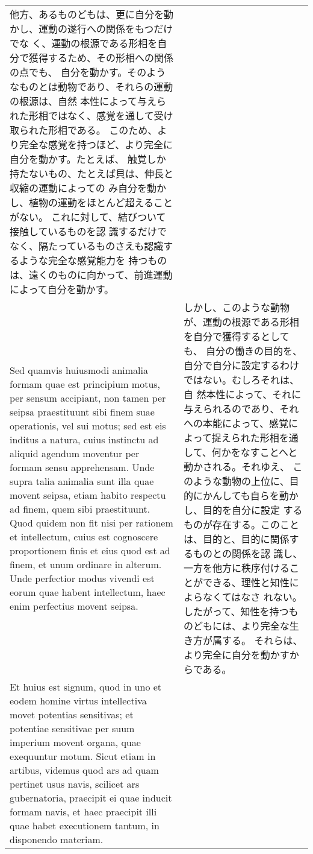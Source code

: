 \documentclass[10pt]{jsarticle} %
\begin{document}
\begin{longtable}{p{21em}p{21em}}
他方、あるものどもは、更に自分を動かし、運動の遂行への関係をもつだけでな
 く、運動の根源である形相を自分で獲得するため、その形相への関係の点でも、
 自分を動かす。そのようなものとは動物であり、それらの運動の根源は、自然
 本性によって与えられた形相ではなく、感覚を通して受け取られた形相である。
 このため、より完全な感覚を持つほど、より完全に自分を動かす。たとえば、
 触覚しか持たないもの、たとえば貝は、伸長と収縮の運動によっての
 み自分を動かし、植物の運動をほとんど超えることがない。
これに対して、結びついて接触しているものを認
 識するだけでなく、隔たっているものさえも認識するような完全な感覚能力を
 持つものは、遠くのものに向かって、前進運動によって自分を動かす。


\\


Sed quamvis huiusmodi animalia formam quae est principium
motus, per sensum accipiant, non tamen per seipsa praestituunt sibi
finem suae operationis, vel sui motus; sed est eis inditus a natura,
cuius instinctu ad aliquid agendum moventur per formam sensu
apprehensam. Unde supra talia animalia sunt illa quae movent seipsa,
etiam habito respectu ad finem, quem sibi praestituunt. Quod quidem non
fit nisi per rationem et intellectum, cuius est cognoscere proportionem
finis et eius quod est ad finem, et unum ordinare in alterum. Unde
perfectior modus vivendi est eorum quae habent intellectum, haec enim
perfectius movent seipsa. 

&

しかし、このような動物が、運動の根源である形相を自分で獲得するとしても、
 自分の働きの目的を、自分で自分に設定するわけではない。むしろそれは、自
 然本性によって、それに与えられるのであり、それへの本能によって、感覚に
 よって捉えられた形相を通して、何かをなすことへと動かされる。それゆえ、
 このような動物の上位に、目的にかんしても自らを動かし、目的を自分に設定
 するものが存在する。このことは、目的と、目的に関係するものとの関係を認
 識し、一方を他方に秩序付けることができる、理性と知性によらなくてはなさ
 れない。したがって、知性を持つものどもには、より完全な生き方が属する。
 それらは、より完全に自分を動かすからである。

\\


Et huius est signum, quod in uno et eodem
homine virtus intellectiva movet potentias sensitivas; et potentiae
sensitivae per suum imperium movent organa, quae exequuntur motum. Sicut
etiam in artibus, videmus quod ars ad quam pertinet usus navis, scilicet
ars gubernatoria, praecipit ei quae inducit formam navis, et haec
praecipit illi quae habet executionem tantum, in disponendo
materiam. 


\end{longtable}
\end{document}
